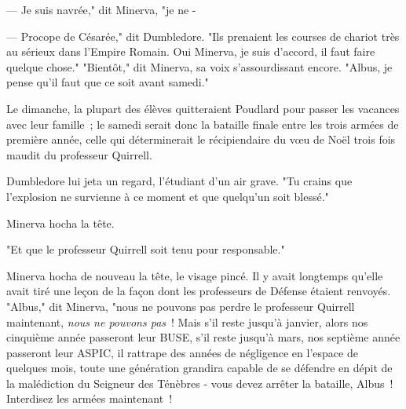 --- Je suis navrée," dit Minerva, "je ne -

--- Procope de Césarée\footnotemark{}," dit Dumbledore. "Ils prenaient les courses de chariot très au sérieux dans l'Empire Romain. Oui Minerva, je suis d'accord, il faut faire quelque chose."
"Bientôt," dit Minerva, sa voix s'assourdissant encore. "Albus, je pense qu'il faut que ce soit avant samedi."

Le dimanche, la plupart des élèves quitteraient Poudlard pour passer les vacances avec leur famille~; le samedi serait donc la bataille finale entre les trois armées de première année, celle qui déterminerait le récipiendaire du vœu de Noël trois fois maudit du professeur Quirrell.

Dumbledore lui jeta un regard, l'étudiant d'un air grave. "Tu crains que l'explosion ne survienne à ce moment et que quelqu'un soit blessé."

Minerva hocha la tête.

"Et que le professeur Quirrell soit tenu pour responsable."

Minerva hocha de nouveau la tête, le visage pincé. Il y avait longtemps qu'elle avait tiré une leçon de la façon dont les professeurs de Défense étaient renvoyés. "Albus," dit Minerva, "nous ne pouvons pas perdre le professeur Quirrell maintenant, \emph{nous ne pouvons pas}~! Mais s'il reste jusqu'à janvier, alors nos cinquième année passeront leur BUSE, s'il reste jusqu'à mars, nos septième année passeront leur ASPIC, il rattrape des années de négligence en l'espace de quelques mois, toute une génération grandira capable de se défendre en dépit de la malédiction du Seigneur des Ténèbres - vous devez arrêter la bataille, Albus~! Interdisez les armées maintenant~!

